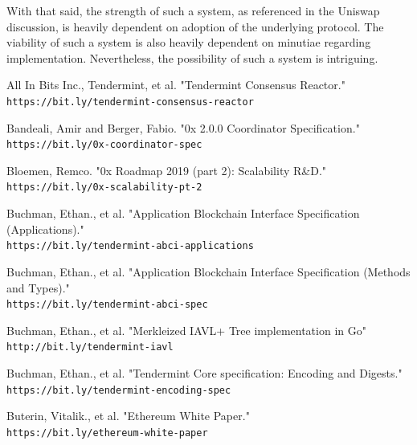 \documentclass[10pt]{article}
\begin{document}
With that said, the strength of such a system, as referenced in the Uniswap discussion, is heavily dependent on adoption of the underlying protocol. The viability of such a system is also heavily dependent on minutiae regarding implementation. Nevertheless, the possibility of such a system is intriguing.
\clearpage
\pagebreak


\begin{thebibliography}{9}

All In Bits Inc., Tendermint, et al. "Tendermint Consensus Reactor."
\\\texttt{https://bit.ly/tendermint-consensus-reactor}

Bandeali, Amir and Berger, Fabio. "0x 2.0.0 Coordinator Specification."
\\\texttt{https://bit.ly/0x-coordinator-spec}

Bloemen, Remco. "0x Roadmap 2019 (part 2): Scalability R\&D."
\\\texttt{https://bit.ly/0x-scalability-pt-2}

Buchman, Ethan., et al. "Application Blockchain Interface Specification (Applications)."
\\\texttt{https://bit.ly/tendermint-abci-applications}

Buchman, Ethan., et al. "Application Blockchain Interface Specification (Methods and Types)."
\\\texttt{https://bit.ly/tendermint-abci-spec}

Buchman, Ethan., et al. "Merkleized IAVL+ Tree implementation in Go"
\\\texttt{http://bit.ly/tendermint-iavl}

Buchman, Ethan., et al. "Tendermint Core specification: Encoding and Digests."
\\\texttt{https://bit.ly/tendermint-encoding-spec}

Buterin, Vitalik., et al. "Ethereum White Paper."
\\\texttt{https://bit.ly/ethereum-white-paper}


\end{thebibliography}
\end{document}
